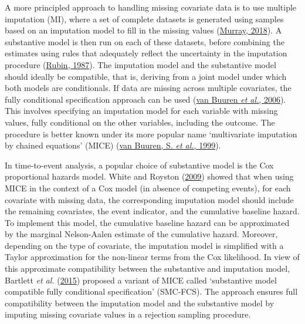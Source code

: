 \documentclass[
  letterpaper,
  DIV=11,
  numbers=noendperiod]{scrreprt}
\begin{document}
A more principled approach to handling missing covariate data is to use
multiple imputation (MI), where a set of complete datasets is generated
using samples based on an imputation model to fill in the missing values
(\protect\hyperlink{ref-murrayMultipleImputationReview2018}{Murray,
2018}). A substantive model is then run on each of these datasets,
before combining the estimates using rules that adequately reflect the
uncertainty in the imputation procedure
(\protect\hyperlink{ref-rubin:1987}{Rubin, 1987}). The imputation model
and the substantive model should ideally be compatible, that is,
deriving from a joint model under which both models are conditionals. If
data are missing across multiple covariates, the fully conditional
specification approach can be used
(\protect\hyperlink{ref-vanbuurenFullyConditionalSpecification2006}{van
Buuren \emph{et al.}, 2006}). This involves specifying an imputation
model for each variable with missing values, fully conditional on the
other variables, including the outcome. The procedure is better known
under its more popular name `multivariate imputation by chained
equations' (MICE)
(\protect\hyperlink{ref-vanbuurens.FlexibleMultivariateImputation1999}{van
Buuren, S. \emph{et al.}, 1999}).

In time-to-event analysis, a popular choice of substantive model is the
Cox proportional hazards model. White and Royston
(\protect\hyperlink{ref-whiteImputingMissingCovariate2009}{2009}) showed
that when using MICE in the context of a Cox model (in absence of
competing events), for each covariate with missing data, the
corresponding imputation model should include the remaining covariates,
the event indicator, and the cumulative baseline hazard. To implement
this model, the cumulative baseline hazard can be approximated by the
marginal Nelson-Aalen estimate of the cumulative hazard. Moreover,
depending on the type of covariate, the imputation model is simplified
with a Taylor approximation for the non-linear terms from the Cox
likelihood. In view of this approximate compatibility between the
substantive and imputation model, Bartlett \emph{et al.}
(\protect\hyperlink{ref-bartlettMultipleImputationCovariates2015}{2015})
proposed a variant of MICE called `substantive model compatible fully
conditional specification' (SMC-FCS). The approach ensures full
compatibility between the imputation model and the substantive model by
imputing missing covariate values in a rejection sampling procedure.
\end{document}
